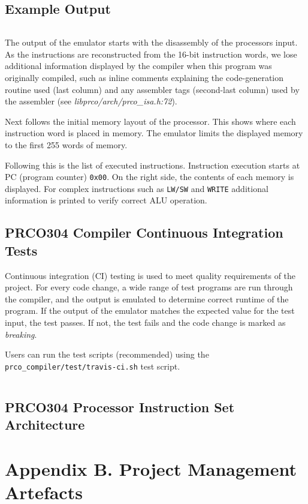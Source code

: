 \documentclass[11pt,a4paper]{report}
\newcommand{\scname}{PRCO304}
\begin{document}
\subsection*{Example Output}
\inputminted{text}{emu_output.tex}
\scriptsize
The output of the emulator starts with the disassembly of the processors input. As the instructions are reconstructed from the 16-bit instruction words, we lose additional information displayed by the compiler when this program was originally compiled, such as inline comments explaining the code-generation routine used (last column) and any assembler tags (second-last column) used by the assembler (see \textit{libprco/arch/prco\_isa.h:72}).

Next follows the initial memory layout of the processor. This shows where each instruction word is placed in memory. The emulator limits the displayed memory to the first 255 words of memory.

Following this is the list of executed instructions. Instruction execution starts at PC  (program counter) \verb|0x00|. On the right side, the contents of each memory is displayed. For complex instructions such as \verb|LW/SW| and \verb|WRITE| additional information is printed to verify correct ALU operation.
\normalsize

\newpage
\subsection{\scname{} Compiler Continuous Integration Tests}
Continuous integration (CI) testing is used to meet quality requirements of the project. For every code change, a wide range of test programs are run through the compiler, and the output is emulated to determine correct runtime of the program. If the output of the emulator matches the expected value for the test input, the test passes. If not, the test fails and the code change is marked as \textit{breaking}.

Users can run the test scripts (recommended) using the \verb|prco_compiler/test/travis-ci.sh| test script.

\label{appendix:travisci}
\inputminted{text}{compiler_ci.txt}

\newpage
\subsection{\scname{} Processor Instruction Set Architecture}
\label{appendix:isa}


\newpage
\section{Appendix B. Project Management Artefacts}

\end{document}
